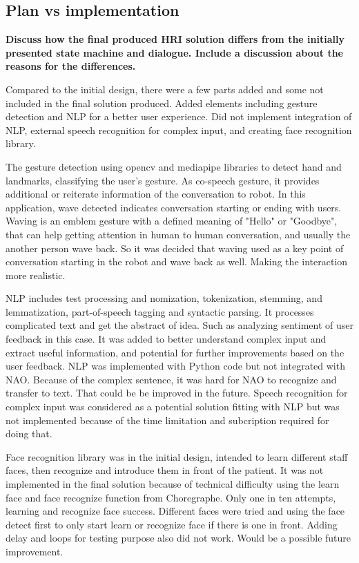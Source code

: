 \documentclass[conference]{IEEEtran}
\begin{document}
\subsection{Plan vs implementation}
\textbf{Discuss how the final produced HRI solution differs from the initially presented state machine and dialogue. Include a discussion about the reasons for the differences.}

Compared to the initial design, there were a few parts added and some not included in the final solution produced. Added elements including gesture detection and NLP for a better user experience. Did not implement integration of NLP, external speech recognition for complex input, and creating face recognition library.

The gesture detection using opencv and mediapipe libraries to detect hand and landmarks, classifying the user's gesture. As co-speech gesture, it provides additional or reiterate information of the conversation to robot. In this application, wave detected indicates conversation starting or ending with users. Waving is an emblem gesture with a defined meaning of "Hello" or "Goodbye", that can help getting attention in human to human conversation, and usually the another person wave back. So it was decided that waving used as a key point of conversation starting in the robot and wave back as well. Making the interaction more realistic.

NLP includes test processing and nomization, tokenization, stemming, and lemmatization, part-of-speech tagging and syntactic parsing. It processes complicated text and get the abstract of idea. Such as analyzing sentiment of user feedback in this case. It was added to better understand complex input and extract useful information, and potential for further improvements based on the user feedback. NLP was implemented with Python code but not integrated with NAO. Because of the complex sentence, it was hard for NAO to recognize and transfer to text. That could be be improved in the future. Speech recognition for complex input was considered as a potential solution fitting with NLP but was not implemented because of the time limitation and subcription required for doing that.

Face recognition library was in the initial design, intended to learn different staff faces, then recognize and introduce them in front of the patient. It was not implemented in the final solution because of technical difficulty using the learn face and face recognize function from Choregraphe. Only one in ten attempts, learning and recognize face success. Different faces were tried and using the face detect first to only start learn or recognize face if there is one in front. Adding delay and loops for testing purpose also did not work. Would be a possible future improvement.
\end{document}
